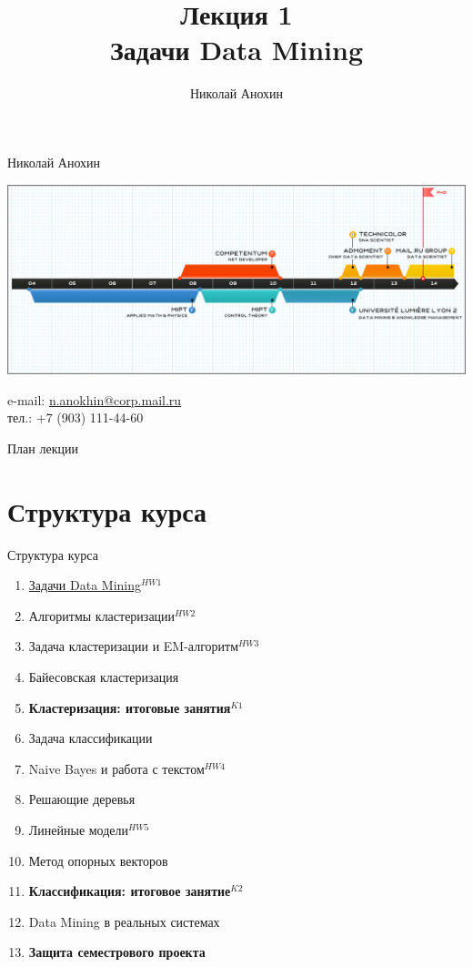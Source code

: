 \documentclass[aspectratio=169]{beamer}
\author{Николай Анохин}
\title{\newline \newline \newline Лекция 1 \\ Задачи Data Mining}
\let\otp\titlepage
\renewcommand{\titlepage}{\otp\addtocounter{framenumber}{-1}}
\begin{document}
\begin{frame}[plain]
\titlepage
\end{frame}

\begin{frame}{Николай Анохин}

\begin{center}
\includegraphics[scale=0.325]{images/timeline.png}
\end{center}

\begin{footnotesize}
e-mail: \href{mailto:n.anokhin@corp.mail.ru}{n.anokhin@corp.mail.ru} \\
тел.: +7 (903) 111-44-60
\end{footnotesize}

\end{frame}

\begin{frame}{План лекции}
\tableofcontents
\end{frame}

\section{Структура курса}

\begin{frame}{Структура курса}

{\small
\begin{enumerate}
\item \underline{Задачи Data Mining}{\color{red}$^{HW1}$}
\item Алгоритмы кластеризации{\color{red}$^{HW2}$}
\item Задача кластеризации и EM-алгоритм{\color{red}$^{HW3}$}
\item Байесовская кластеризация
\item \textbf{Кластеризация: итоговые занятия}{\color{red}$^{K1}$}
\item Задача классификации
\item Naive Bayes и работа с текстом{\color{red}$^{HW4}$}
\item Решающие деревья
\item Линейные модели{\color{red}$^{HW5}$}
\item Метод опорных векторов
\item \textbf{Классификация: итоговое занятие}{\color{red}$^{K2}$}
\item Data Mining в реальных системах
\item \textbf{Защита семестрового проекта}
\end{enumerate}
}

\end{frame}
\end{document}
